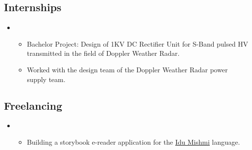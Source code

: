 \documentclass[11pt,a4paper,sans]{moderncv}
\begin{document}
\begin{itemize}
\vspace{6pt}



\subsection{Internships}

\begin{itemize}

\vspace{6pt}

\item{}

\begin{itemize}
    \item Bachelor Project: Design of 1KV DC Rectifier Unit for S-Band pulsed HV transmitted in the field of Doppler Weather Radar. 

    \item Worked with the design team of the Doppler Weather Radar power supply team.

\end{itemize}

\vspace{6pt}


\end{itemize}

\vspace{6pt}


\vspace{6pt}

\subsection{Freelancing}

\begin{itemize}

\vspace{6pt}

\item{}

\begin{itemize}
    \item Building a storybook e-reader application for the {\href{https://en.wikipedia.org/wiki/Idu_Mishmi_language}{\underline {Idu Mishmi}}} language. 


\end{itemize}
\end{itemize}
\end{itemize}
\end{document}
